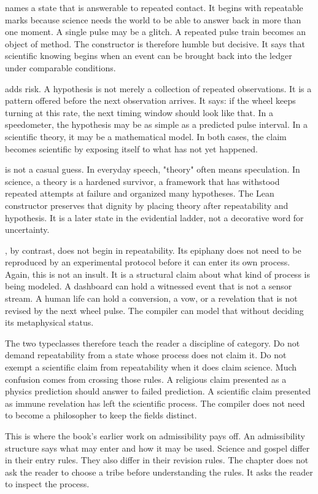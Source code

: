  names a state that is answerable to repeated contact. It begins
with repeatable marks because science needs the world to be able to answer
back in more than one moment. A single pulse may be a glitch. A repeated pulse
train becomes an object of method. The constructor  is
therefore humble but decisive. It says that scientific knowing begins when an
event can be brought back into the ledger under comparable conditions.

 adds risk. A hypothesis is not merely a collection of
repeated observations. It is a pattern offered before the next observation
arrives. It says: if the wheel keeps turning at this rate, the next timing
window should look like that. In a speedometer, the hypothesis may be as simple
as a predicted pulse interval. In a scientific theory, it may be a mathematical
model. In both cases, the claim becomes scientific by exposing itself to what
has not yet happened.

 is not a casual guess. In everyday speech, "theory" often means
speculation. In science, a theory is a hardened survivor, a framework that has
withstood repeated attempts at failure and organized many hypotheses. The Lean
constructor preserves that dignity by placing theory after repeatability and
hypothesis. It is a later state in the evidential ladder, not a decorative word
for uncertainty.

, by contrast, does not begin in repeatability. Its epiphany does
not need to be reproduced by an experimental protocol before it can enter its
own process. Again, this is not an insult. It is a structural claim about what
kind of process is being modeled. A dashboard can hold a witnessed event that
is not a sensor stream. A human life can hold a conversion, a vow, or a
revelation that is not revised by the next wheel pulse. The compiler can model
that without deciding its metaphysical status.

The two typeclasses therefore teach the reader a discipline of category. Do
not demand repeatability from a state whose process does not claim it. Do not
exempt a scientific claim from repeatability when it does claim science. Much
confusion comes from crossing those rules. A religious claim presented as a
physics prediction should answer to failed prediction. A scientific claim
presented as immune revelation has left the scientific process. The compiler
does not need to become a philosopher to keep the fields distinct.

This is where the book's earlier work on admissibility pays off. An
admissibility structure says what may enter and how it may be used. Science and
gospel differ in their entry rules. They also differ in their revision rules.
The chapter does not ask the reader to choose a tribe before understanding the
rules. It asks the reader to inspect the process.

